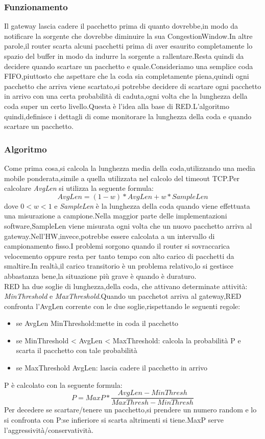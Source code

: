 \subsubsection{Funzionamento}
Il gateway lascia cadere il pacchetto prima di quanto dovrebbe,in modo da notificare la sorgente che dovrebbe diminuire la sua CongestionWindow.In altre parole,il router scarta alcuni pacchetti prima di aver esaurito completamente lo spazio del buffer in modo da indurre la sorgente a rallentare.Resta quindi da decidere quando scartare un pacchetto e quale.Consideriamo una semplice coda FIFO,piuttosto che aspettare che la coda sia completamente piena,quindi ogni pacchetto che arriva viene scartato,si potrebbe decidere di scartare ogni pacchetto in arrivo con una certa probabilità di caduta,ogni volta che la lunghezza della coda super un certo livello.Questa è l'idea alla base di RED.L'algoritmo quindi,definisce i dettagli di come monitorare la lunghezza della coda e quando scartare un pacchetto.\\
\subsubsection{Algoritmo}
Come prima cosa,si calcola la lunghezza media della coda,utilizzando una media mobile ponderata,simile a quella utilizzata nel calcolo del timeout TCP.Per calcolare \textit{AvgLen} si utilizza la seguente formula:
\begin{equation}
  AvgLen = (1 - w) * AvgLen + w * SampleLen
\end{equation}
dove $0 < w < 1$ e \textit{SampleLen} è la lunghezza della coda quando viene effettuata una misurazione a campione.Nella maggior parte delle implementazioni software,SampleLen viene misurata ogni volta che un nuovo pacchetto arriva al gateway.Nell'HW,invece,potrebbe essere calcolata a un intervallo di campionamento fisso.I problemi sorgono quando il router si sovraccarica velocemento oppure resta per tanto tempo con alto carico di pacchetti da smaltire.In realtà,il carico transitorio è un problema relativo,lo si gestisce abbastanza bene,la situazione più grave è quando è duraturo.\\
RED ha due soglie di lunghezza,della coda, che attivano determinate attività: \textit{MinThreshold} e \textit{MaxThreshold}.Quando un pacchetot arriva al gateway,RED confronta l'AvgLen corrente con le due soglie,rispettando le seguenti regole:
\begin{itemize}
  \item se AvgLen \leq MinThreshold:mette in coda il pacchetto
  \item se MinThreshold < AvgLen < MaxThreshold: calcola la probabilità P e scarta il pacchetto con tale probabilità
  \item se MaxThreshold \leq AvgLen: lascia cadere il pacchetto in arrivo
\end{itemize}
P è calcolato con la seguente formula:
\begin{equation}
  P = MaxP * \frac{AvgLen - MinThresh}{MaxThresh - MinThresh}
\end{equation}
Per decedere se scartare/tenere un pacchetto,si prendere un numero random e lo si confronta con P:se infieriore si scarta altrimenti si tiene.MaxP serve l'aggressività/conservatività.
